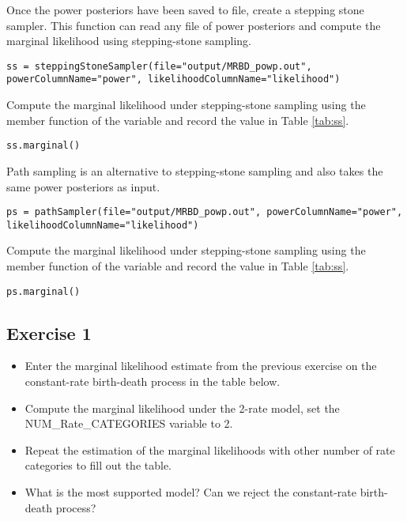 Once the power posteriors have been saved to file, create a stepping stone sampler. 
This function can read any file of power posteriors and compute the marginal likelihood using stepping-stone sampling. 
{\tt \small \begin{snugshade*}
\begin{lstlisting}
ss = steppingStoneSampler(file="output/MRBD_powp.out", powerColumnName="power", likelihoodColumnName="likelihood")
\end{lstlisting}
\end{snugshade*}}

Compute the marginal likelihood under stepping-stone sampling using the member function  of the  variable and record the value in Table \ref{tab:ss}.
{\tt \begin{snugshade*}
\begin{lstlisting}
ss.marginal() 
\end{lstlisting}
\end{snugshade*}}

Path sampling is an alternative to stepping-stone sampling and also takes the same power posteriors as input. 
{\tt \small \begin{snugshade*}
\begin{lstlisting}
ps = pathSampler(file="output/MRBD_powp.out", powerColumnName="power", likelihoodColumnName="likelihood")
\end{lstlisting}
\end{snugshade*}}

Compute the marginal likelihood under stepping-stone sampling using the member function  of the  variable and record the value in Table \ref{tab:ss}.
{\tt \begin{snugshade*}
\begin{lstlisting}
ps.marginal() 
\end{lstlisting}
\end{snugshade*}}




\subsection{Exercise 1}

\begin{itemize}
\item Enter the marginal likelihood estimate from the previous exercise on the constant-rate birth-death process in the table below.
\item Compute the marginal likelihood under the 2-rate model, \IE set the NUM\_Rate\_CATEGORIES variable to 2.
\item Repeat the estimation of the marginal likelihoods with other number of rate categories to fill out the table.
\item What is the most supported model? Can we reject the constant-rate birth-death process?
\end{itemize}

